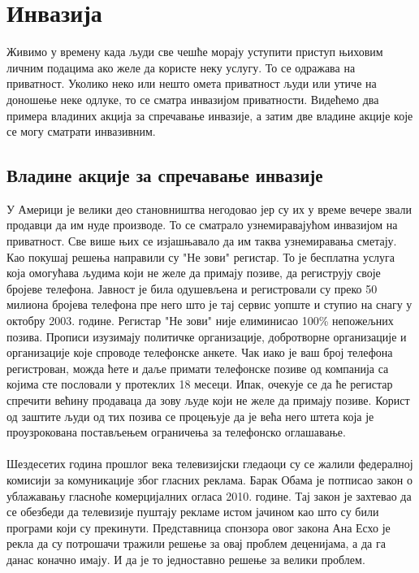 \documentclass{article}
\begin{document}
\newpage
\section{Инвазија}
Живимо у времену када људи све чешће морају уступити приступ њиховим личним подацима ако желе да користе неку услугу. То се одражава на приватност. Уколико неко или нешто омета приватност људи или утиче на доношење неке одлуке, то се сматра инвазијом приватности. Видећемо два примера владиних акција за спречавање инвазије, а затим две владине акције које се могу сматрати инвазивним.

\subsection{Владине акције за спречавање инвазије}
У Америци је велики део становништва негодовао јер су их у време вечере звали продавци да им нуде производе. То се сматрало узнемиравајућом инвазијом на приватност. Све више њих се изјашњавало да им таква узнемиравања сметају. Као покушај решења направили су "Не зови"  регистар. То је бесплатна услуга која омогућава људима који не желе да примају позиве, да региструју своје бројеве телефона. Јавност је била одушевљена и регистровали су преко 50 милиона бројева телефона пре него што је тај сервис уопште и ступио на снагу у октобру 2003. године. Регистар "Не зови" није елиминисао 100\% непожељних позива. Прописи изузимају политичке организације, добротворне организације и организације које спроводе телефонске анкете. Чак иако је ваш број телефона регистрован, можда ћете и даље примати телефонске позиве од компанија са којима сте пословали у протеклих 18 месеци. Ипак, очекује се да ће регистар спречити већину продаваца да зову људе који не желе да примају позиве. Корист од заштите људи од тих позива се процењује да је већа него штета која је проузрокована постављењем ограничења за телефонско оглашавање.
\\\\
Шездесетих година прошлог века телевизијски гледаоци су се жалили федералној комисији за комуникације због гласних реклама. Барак Обама је потписао закон о ублажавању гласноће комерцијалних огласа 2010. године. Тај закон је захтевао да се обезбеди да телевизије пуштају рекламе истом јачином као што су били програми који су прекинути. Представница спонзора овог закона Ана Есхо је рекла да су потрошачи тражили решење за овај проблем деценијама, а да га данас коначно имају. И да је то једноставно решење за велики проблем.
\end{document}
